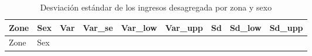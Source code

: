 \documentclass[
  spanish,
  12pt,
]{book}
\begin{document}
\begin{longtable}[]{@{}
  >{\raggedright\arraybackslash}p{}
  >{\centering\arraybackslash}p{}
  >{\centering\arraybackslash}p{}
  >{\centering\arraybackslash}p{}
  >{\centering\arraybackslash}p{}
  >{\centering\arraybackslash}p{}
  >{\centering\arraybackslash}p{}
  >{\centering\arraybackslash}p{}
  >{\centering\arraybackslash}p{}@{}}
\caption{\label{tab:tab-sd-ingreso-zona-sexo}Desviación estándar de los ingresos desagregada por zona y sexo}\tabularnewline
\toprule\noalign{}
\begin{minipage}[b]{\linewidth}\raggedright
Zone
\end{minipage} & \begin{minipage}[b]{\linewidth}\centering
Sex
\end{minipage} & \begin{minipage}[b]{\linewidth}\centering
Var
\end{minipage} & \begin{minipage}[b]{\linewidth}\centering
Var\_se
\end{minipage} & \begin{minipage}[b]{\linewidth}\centering
Var\_low
\end{minipage} & \begin{minipage}[b]{\linewidth}\centering
Var\_upp
\end{minipage} & \begin{minipage}[b]{\linewidth}\centering
Sd
\end{minipage} & \begin{minipage}[b]{\linewidth}\centering
Sd\_low
\end{minipage} & \begin{minipage}[b]{\linewidth}\centering
Sd\_upp
\end{minipage} \\
\midrule\noalign{}
\endfirsthead
\toprule\noalign{}
\begin{minipage}[b]{\linewidth}\raggedright
Zone
\end{minipage} & \begin{minipage}[b]{\linewidth}\centering
Sex
\end{minipage} & \begin{minipage}[b]{\linewidth}\centering

\end{minipage}
\end{longtable}
\end{document}
